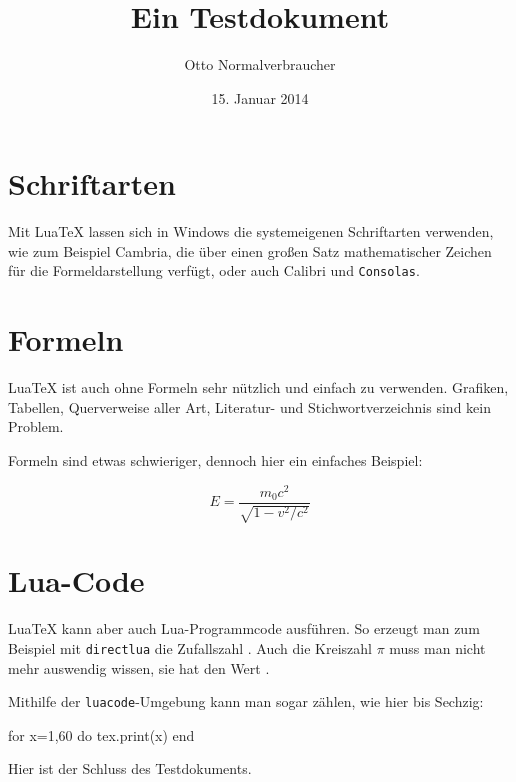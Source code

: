 \documentclass[a4paper]{scrartcl}
\title{Ein Testdokument}
\author{Otto Normalverbraucher}
\date{15. Januar 2014}
\begin{document}
\maketitle
\tableofcontents

\section{Schriftarten}
Mit Lua\TeX{} lassen sich in Windows die systemeigenen Schriftarten verwenden,
wie zum Beispiel Cambria, die über einen großen Satz mathematischer Zeichen für
die Formeldarstellung verfügt, oder auch \textsf{Calibri} und \texttt{Consolas}.

\section{Formeln}
Lua\TeX{} ist auch ohne Formeln sehr nützlich und einfach zu verwenden. Grafiken,
Tabellen, Querverweise aller Art, Literatur- und Stichwortverzeichnis sind
kein Problem.

Formeln sind etwas schwieriger, dennoch hier ein einfaches Beispiel:

\begin{displaymath}
  E = \frac{m_{0} c^{2}}{\sqrt{1-v^{2}/c^{2}}}
\end{displaymath}

\section{Lua-Code}
Lua\TeX{} kann aber auch Lua-Programmcode ausführen. So erzeugt man zum Beispiel
mit \texttt{directlua} die Zufallszahl .
Auch die Kreiszahl $π$ muss man nicht mehr auswendig wissen, sie hat den Wert
.

Mithilfe der \texttt{luacode}-Umgebung kann man sogar zählen, wie hier bis Sechzig:
\begin{luacode}
  for x=1,60 do
    tex.print(x)
  end
\end{luacode}

Hier ist der Schluss des Testdokuments.
\end{document}
